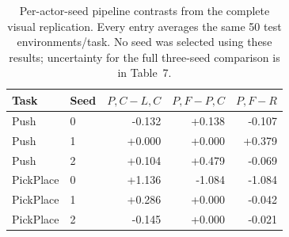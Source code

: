 \documentclass[10pt,a4paper]{article}
\begin{document}
\renewcommand{\thetable}{S\arabic{table}}
\setcounter{table}{7}
\begin{table}[H]\centering\small
\caption{Per-actor-seed pipeline contrasts from the complete visual replication. Every entry averages the same 50 test environments/task. No seed was selected using these results; uncertainty for the full three-seed comparison is in Table~7.}
\begin{tabular}{llrrr}\toprule Task & Seed & $P,C-L,C$ & $P,F-P,C$ & $P,F-R$\\\midrule
Push & 0 & -0.132 & +0.138 & -0.107\\
Push & 1 & +0.000 & +0.000 & +0.379\\
Push & 2 & +0.104 & +0.479 & -0.069\\
PickPlace & 0 & +1.136 & -1.084 & -1.084\\
PickPlace & 1 & +0.286 & +0.000 & -0.042\\
PickPlace & 2 & -0.145 & +0.000 & -0.021\\
\bottomrule\end{tabular}\end{table}
\end{document}
